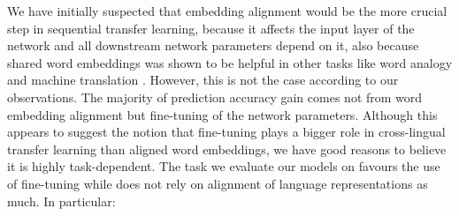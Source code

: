 \documentclass[]{article}
\begin{document}
We have initially suspected that embedding alignment would be the more crucial step in sequential transfer learning, because it affects the input layer of the network and all downstream network parameters depend on it, also because shared word embeddings was shown to be helpful in other tasks like word analogy and machine translation \cite{mikolov2013exploiting,artetxe2017learning}. However, this is not the case according to our observations. The majority of prediction accuracy gain comes not from word embedding alignment but fine-tuning of the network parameters. Although this appears to suggest the notion that fine-tuning plays a bigger role in cross-lingual transfer learning than aligned word embeddings, we have good reasons to believe it is highly task-dependent. The task we evaluate our models on favours the use of fine-tuning while does not rely on alignment of language representations as much. In particular:
\end{document}
